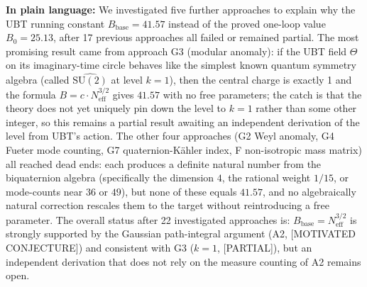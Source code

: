 \documentclass[11pt,a4paper]{article}
\theoremstyle{definition}
\theoremstyle{remark}
\begin{document}
\textbf{In plain language:}
We investigated five further approaches to explain why the UBT running
constant $B_{\mathrm{base}} = 41.57$ instead of the proved one-loop value
$B_0 = 25.13$, after 17 previous approaches all failed or remained partial.
The most promising result came from approach G3 (modular anomaly): if the
UBT field $\Theta$ on its imaginary-time circle behaves like the simplest
known quantum symmetry algebra (called $\widehat{\mathrm{SU}(2)}$ at level
$k = 1$), then the central charge is exactly 1 and the formula
$B = c \cdot N_{\mathrm{eff}}^{3/2}$ gives $41.57$ with no free parameters;
the catch is that the theory does not yet uniquely pin down the level to
$k = 1$ rather than some other integer, so this remains a partial result
awaiting an independent derivation of the level from UBT's action.
The other four approaches (G2 Weyl anomaly, G4 Fueter mode counting, G7
quaternion-Kähler index, F non-isotropic mass matrix) all reached dead ends:
each produces a definite natural number from the biquaternion algebra
(specifically the dimension $4$, the rational weight $1/15$, or mode-counts
near $36$ or $49$), but none of these equals $41.57$, and no algebraically
natural correction rescales them to the target without reintroducing a free
parameter.
The overall status after 22 investigated approaches is:
$B_{\mathrm{base}} = N_{\mathrm{eff}}^{3/2}$ is strongly supported by the
Gaussian path-integral argument (A2, [MOTIVATED CONJECTURE]) and
consistent with G3 ($k=1$, [PARTIAL]), but an independent
derivation that does not rely on the measure counting of A2 remains open.

\ifdefined\INCLUDEMODE\else
\end{document}
